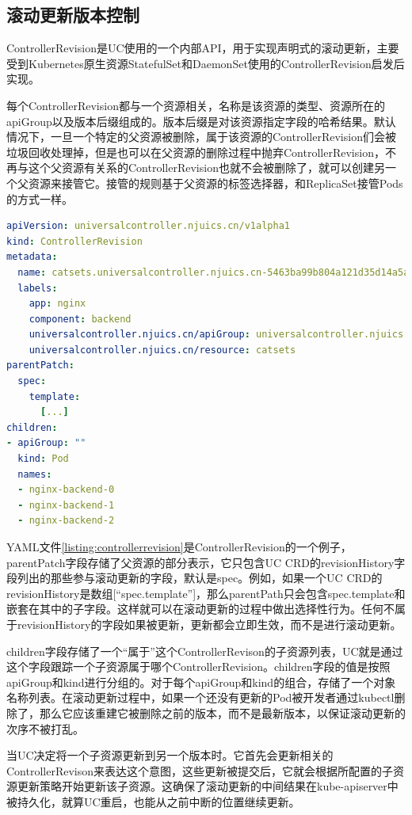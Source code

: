 \documentclass[macfonts,master]{njuthesis}
\begin{document}
\subsection{滚动更新版本控制}\label{section:rolling-control}
ControllerRevision是UC使用的一个内部API，用于实现声明式的滚动更新，主要受到Kubernetes原生资源StatefulSet和DaemonSet使用的ControllerRevision启发后实现。


每个ControllerRevision都与一个资源相关，名称是该资源的类型、资源所在的apiGroup以及版本后缀组成的。版本后缀是对该资源指定字段的哈希结果。默认情况下，一旦一个特定的父资源被删除，属于该资源的ControllerRevision们会被垃圾回收处理掉，但是也可以在父资源的删除过程中抛弃ControllerRevision，不再与这个父资源有关系的ControllerRevision也就不会被删除了，就可以创建另一个父资源来接管它。接管的规则基于父资源的标签选择器，和ReplicaSet接管Pods的方式一样。

\begin{lstlisting}[language=yaml,caption=ControllerRevision示例,label=listing:controllerrevision]
apiVersion: universalcontroller.njuics.cn/v1alpha1
kind: ControllerRevision
metadata:
  name: catsets.universalcontroller.njuics.cn-5463ba99b804a121d35d14a5ab74546d1e8ba953
  labels:
    app: nginx
    component: backend
    universalcontroller.njuics.cn/apiGroup: universalcontroller.njuics.cn
    universalcontroller.njuics.cn/resource: catsets
parentPatch:
  spec:
    template:
      [...]
children:
- apiGroup: ""
  kind: Pod
  names:
  - nginx-backend-0
  - nginx-backend-1
  - nginx-backend-2
\end{lstlisting}

YAML文件\ref{listing:controllerrevision}是ControllerRevision的一个例子，parentPatch字段存储了父资源的部分表示，它只包含UC CRD的revisionHistory字段列出的那些参与滚动更新的字段，默认是spec。例如，如果一个UC CRD的revisionHistory是数组[``spec.template'']，那么parentPath只会包含spec.template和嵌套在其中的子字段。这样就可以在滚动更新的过程中做出选择性行为。任何不属于revisionHistory的字段如果被更新，更新都会立即生效，而不是进行滚动更新。


children字段存储了一个``属于''这个ControllerRevison的子资源列表，UC就是通过这个字段跟踪一个子资源属于哪个ControllerRevision。children字段的值是按照apiGroup和kind进行分组的。对于每个apiGroup和kind的组合，存储了一个对象名称列表。在滚动更新过程中，如果一个还没有更新的Pod被开发者通过kubectl删除了，那么它应该重建它被删除之前的版本，而不是最新版本，以保证滚动更新的次序不被打乱。

当UC决定将一个子资源更新到另一个版本时。它首先会更新相关的ControllerRevison来表达这个意图，这些更新被提交后，它就会根据所配置的子资源更新策略开始更新该子资源。这确保了滚动更新的中间结果在kube-apiserver中被持久化，就算UC重启，也能从之前中断的位置继续更新。
\end{document}
